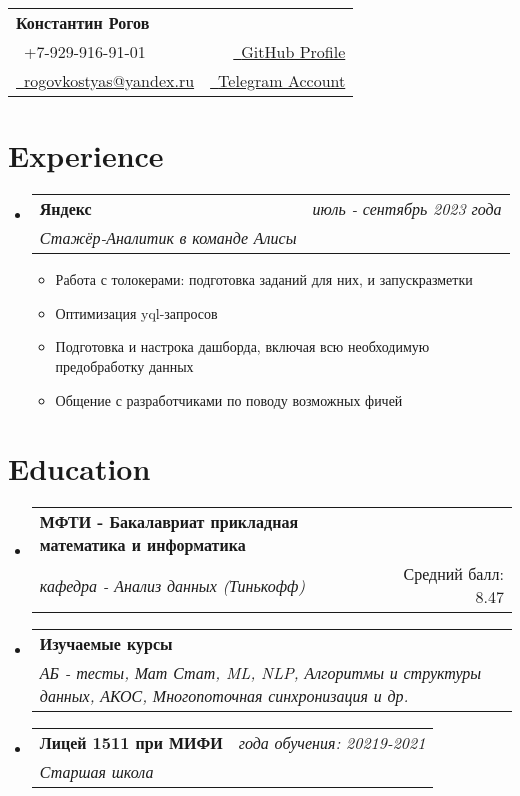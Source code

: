 \documentclass[a4paper,11pt]{article}
\makeatletter
\newcommand{\resumeSubheading}[4]{
\vspace{0.5mm}\item
    \begin{tabular*}{0.98\textwidth}[t]{l@{\extracolsep{\fill}}r}
        \textbf{#1} & \textit{\footnotesize{#4}} \\
        \textit{\footnotesize{#3}} &  \footnotesize{#2}\\
    \end{tabular*}
    \vspace{-2.4mm}
}
\newcommand{\resumeSubHeadingListStart}{\begin{itemize}[leftmargin=*,labelsep=0mm]}
\newcommand{\resumeItemListStart}{\begin{justify}\begin{itemize}[leftmargin=3ex, rightmargin=2ex, noitemsep,labelsep=1.2mm,itemsep=0mm]\small}
\newcommand{\resumeSubHeadingListEnd}{\end{itemize}\vspace{2mm}}
\newcommand{\resumeItemListEnd}{\end{itemize}\end{justify}\vspace{-2mm}}
\newcommand{\name}{Константин Рогов} %
\newcommand{\phone}{929-916-91-01}
\newcommand{\emaila}{rogovkostyas@yandex.ru}
\makeatother
\begin{document}
\selectfont


\parbox{\dimexpr\linewidth-0.3cm\relax}{
\begin{tabularx}{\linewidth}{L r} \\
  \textbf{\Large \name} \\ 
  {\raisebox{0.0\height}{\footnotesize \faPhone}\ +7-\phone} & \href{https://github.com/Rogov-KS}{\raisebox{0.0\height}{\footnotesize \faGithub}\ {GitHub Profile}}\\
  \href{mailto:\emaila}{\raisebox{0.0\height}{\footnotesize 
 \faEnvelope}\ {\emaila}}&\href{https://t.me/RogovKostya}{\raisebox{0.0\height}{\footnotesize \faTelegram}\ {Telegram Account}}
\end{tabularx}
}





\section{\textbf{Experience}}
  \resumeSubHeadingListStart

    \resumeSubheading
      {Яндекс}{}
      {Стажёр-Аналитик в команде Алисы}{июль - сентябрь 2023 года}
      \vspace{-2.0mm}
      \resumeItemListStart
    \item {Работа с толокерами: подготовка заданий для них, и запуск разметки}
    \item {Оптимизация yql-запросов}
    \item {Подготовка и настрока дашборда, включая всю необходимую предобработку данных}
    \item {Общение с разработчиками по поводу возможных фичей}
    
    \resumeItemListEnd
    
    \vspace{-3.0mm}
    
      
  \resumeSubHeadingListEnd
\vspace{-8.5mm}



\section{\textbf{Education}}
  \resumeSubHeadingListStart
    \resumeSubheading
      {МФТИ - Бакалавриат прикладная математика и информатика}{Средний балл: 8.47}
      {кафедра - Анализ данных (Тинькофф)}{}
    \resumeSubheading
      {Изучаемые курсы}{}
      {АБ - тесты, Мат Стат, ML, NLP, Алгоритмы и структуры данных, АКОС, Многопоточная синхронизация и др.}{}
  \resumeSubheading
      {Лицей 1511 при МИФИ}{}
      {Старшая школа}{года обучения: 20219-2021}
  \resumeSubHeadingListEnd
\vspace{-5.5mm}
%
\end{document}
